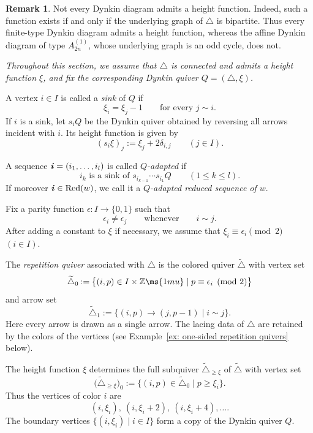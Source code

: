 \documentclass[12pt, leqno]{amsart}
\numberwithin{equation}{section}
\theoremstyle{plain}
\theoremstyle{definition}
\newtheorem{remark}[lemma]{Remark}
\newcommand{\seteq}{\mathbin{:=}}
\newcommand{\Z}{\mathbb{Z}\ms{1mu}}
\newcommand{\Dynkin}{\triangle}
\newcommand{\ii}{ \textbf{\textit{i}}}
\newcommand{\tDynkin}{{\widetilde{\Dynkin}}}
\newcommand{\Red}{\mathrm{Red}}
\begin{document}
\begin{remark} \label{rmk: not every Dynkin quiver allowed}
Not every Dynkin diagram admits a height function.  Indeed, such a
function exists if and only if the underlying graph of \(\Dynkin\)
is bipartite.  Thus every finite-type Dynkin diagram admits a height
function, whereas the affine Dynkin diagram of type
\(A_{2n}^{(1)}\), whose underlying graph is an odd cycle, does not.
\end{remark}

\smallskip

\emph{Throughout this section, we assume that \(\Dynkin\) is connected
and admits a height function \(\xi\), and fix the corresponding
Dynkin quiver \(Q=(\Dynkin,\xi)\).}
\smallskip


A vertex \(i\in I\) is called a \emph{sink} of \(Q\) if
\[
\xi_i=\xi_j-1 \qquad\text{for every }j\sim i.
\]
If \(i\) is a sink, let \(s_iQ\) be the Dynkin quiver obtained by
reversing all arrows incident with \(i\).  Its height function is
given by
\[
(s_i\xi)_j \seteq \xi_j+2\delta_{i,j} \qquad(j\in I).
\]

A sequence $\ii=(i_1,\ldots,i_l)$ is called \emph{\(Q\)-adapted} if
\[
i_k \text{ is a sink of } s_{i_{k-1}}\cdots s_{i_1}Q \qquad(1\leq k\leq l).
\]
If moreover \(\ii\in\Red(w)\), we call it a
\emph{\(Q\)-adapted reduced sequence of \(w\)}.

Fix a parity function $\epsilon:I\longrightarrow\{0,1\}$
such that
\[
\epsilon_i\ne\epsilon_j \qquad\text{whenever}\qquad
i\sim j.
\]
After adding a constant to \(\xi\)  if
necessary, we assume that
$\xi_i\equiv\epsilon_i\pmod2$ $(i\in I)$.

The \emph{repetition quiver} associated with \(\Dynkin\) is the
colored quiver \(\tDynkin\) with vertex set
\[
\tDynkin_0 \seteq \bigl\{ (i,p)\in I\times\Z \mid p\equiv\epsilon_i\pmod2 \bigr\}
\]
and arrow set
\[
\tDynkin_1 \seteq \bigl\{ (i,p)\longrightarrow(j,p-1) \mid i\sim j \bigr\}.
\]
Here every arrow is drawn as a single arrow.  The lacing data of
\(\Dynkin\) are retained by the colors of the vertices (see Example~\ref{ex: one-sided repetition quivers} below).

The height function \(\xi\) determines the full subquiver
$\tDynkin_{\geq\xi}$
of \(\tDynkin\) with vertex set
\[
\bigl(\tDynkin_{\geq\xi}\bigr)_0 \seteq \bigl\{ (i,p)\in\tDynkin_0 \mid p\geq\xi_i \bigr\}.
\]
Thus the vertices of color \(i\) are
\[
(i,\xi_i),\  (i,\xi_i+2),\  (i,\xi_i+4),\ldots.
\]
The boundary vertices
$\{(i,\xi_i)\mid i\in I\}$
form a copy of the Dynkin quiver \(Q\).
\end{document}
